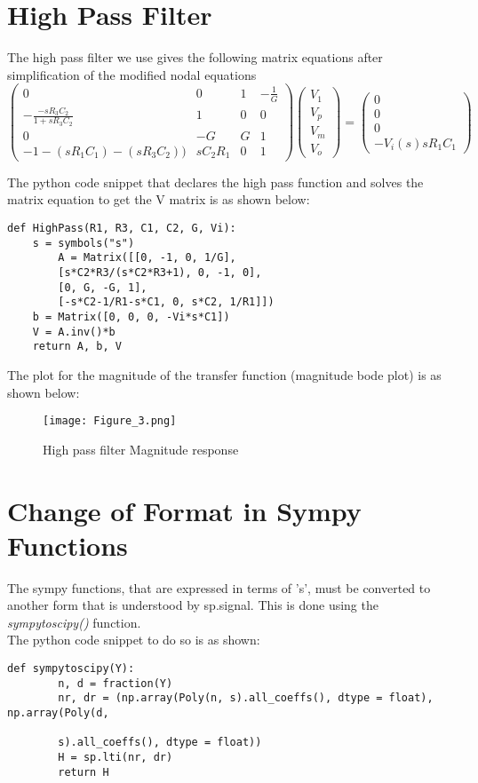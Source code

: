 \documentclass[11pt, a4paper]{article}
\begin{document}
\section*{High Pass Filter}
The high pass filter we use gives the following matrix equations after simplification of the modified nodal equations
\[\begin{pmatrix} 0 & 0 & 1 & -\frac{1}{G} \\ -\frac{-sR_3C_2}{1+sR_3C_2} & 1 & 0 & 0 \\ 0 & -G & G & 1 \\ -1-(sR_1C_1)-(sR_3C_2)) & sC_2R_1 & 0 & 1 \end{pmatrix}\begin{pmatrix} V_1 \\ V_p \\ V_m \\ V_o \end{pmatrix} = \begin{pmatrix} 0 \\ 0 \\ 0 \\ -V_i(s)sR_1C_1 \end{pmatrix}\]

The python code snippet that declares the high pass function and solves the matrix equation to get the V matrix is as shown below:

\begin{verbatim}
def HighPass(R1, R3, C1, C2, G, Vi):
    s = symbols("s")
	    A = Matrix([[0, -1, 0, 1/G],
        [s*C2*R3/(s*C2*R3+1), 0, -1, 0],
        [0, G, -G, 1],
        [-s*C2-1/R1-s*C1, 0, s*C2, 1/R1]])
    b = Matrix([0, 0, 0, -Vi*s*C1])
    V = A.inv()*b
    return A, b, V  
\end{verbatim}
The plot for the magnitude of the transfer function (magnitude bode plot) is as shown below:
\begin{figure}[!tbh]
   	\centering
   	\texttt{[image: Figure\_3.png]}
   	\label{fig:32}
   	\caption{High pass filter Magnitude response}
   \end{figure}
\section*{Change of Format in Sympy Functions}
The sympy functions, that are expressed in terms of 's', must be converted to another form that is understood by sp.signal. This is done using the \textit{sympytoscipy()} function.\\
The python code snippet to do so is as shown:
 \begin{verbatim}
def sympytoscipy(Y):
    	n, d = fraction(Y)
    	nr, dr = (np.array(Poly(n, s).all_coeffs(), dtype = float), np.array(Poly(d,
    	
    	s).all_coeffs(), dtype = float))
    	H = sp.lti(nr, dr)
    	return H
\end{verbatim}	
\end{document}
